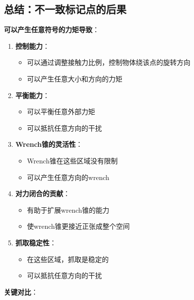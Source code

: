 \documentclass[12pt,a4paper]{article}
\begin{document}
\subsection{总结：不一致标记点的后果}

\textbf{可以产生任意符号的力矩导致}：

\begin{enumerate}
\item \textbf{控制能力}：
   \begin{itemize}
   \item 可以通过调整接触力比例，控制物体绕该点的旋转方向
   \item 可以产生任意大小和方向的力矩
   \end{itemize}

\item \textbf{平衡能力}：
   \begin{itemize}
   \item 可以平衡任意外部力矩
   \item 可以抵抗任意方向的干扰
   \end{itemize}

\item \textbf{Wrench锥的灵活性}：
   \begin{itemize}
   \item Wrench锥在这些区域没有限制
   \item 可以产生任意方向的wrench
   \end{itemize}

\item \textbf{对力闭合的贡献}：
   \begin{itemize}
   \item 有助于扩展wrench锥的能力
   \item 使wrench锥更接近正张成整个空间
   \end{itemize}

\item \textbf{抓取稳定性}：
   \begin{itemize}
   \item 在这些区域，抓取是稳定的
   \item 可以抵抗任意方向的干扰
   \end{itemize}
\end{enumerate}

\textbf{关键对比}：
\end{document}
